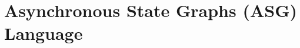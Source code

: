 \documentclass[../main.tex]{subfiles}
\begin{document}
\chapter{Asynchronous State Graphs (ASG) Language}
\end{document}
